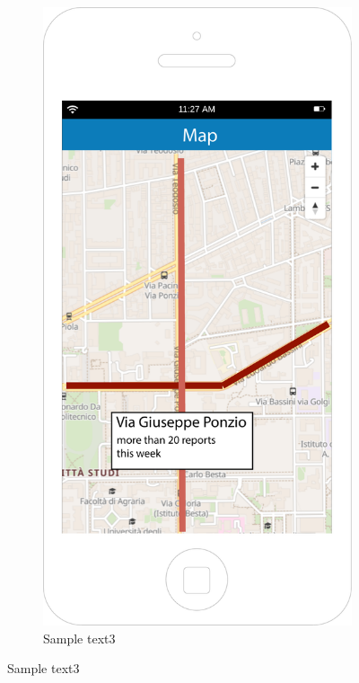 \documentclass[12pt,a4paper]{report}
\begin{document}
\begin{figure}
\begin{subfigure}{0.5\textwidth}
		\end{subfigure}
		\begin{subfigure}{0.5\textwidth}
			\includegraphics[scale=0.25, center]{Map-detail}
			\caption{Sample text3}
			\label{fig:subim2}
		\end{subfigure}
		\end{figure}
\end{document}
